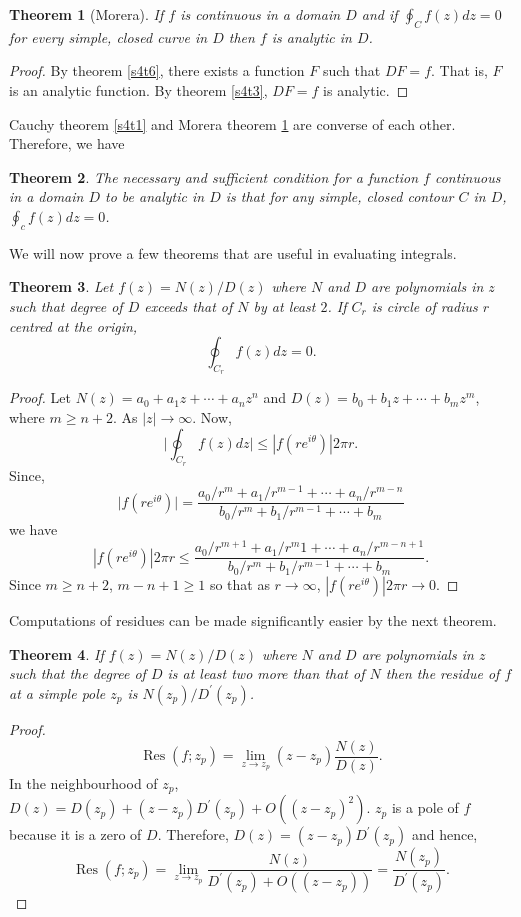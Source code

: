 \documentclass{article}
\theoremstyle{plain}
\newtheorem{thm}{Theorem}
\numberwithin{thm}{section}
\theoremstyle{plain}
\numberwithin{prop}{section}
\theoremstyle{plain}
\numberwithin{prop}{section}
\theoremstyle{definition}
\numberwithin{defn}{section}
\theoremstyle{remark}
\numberwithin{equation}{section}
\newcommand{\op}{\prime}
\DeclareMathOperator{\res}{Res}
\begin{document}
\begin{thm}[Morera]\label{s4t7}
If $f$ is continuous in a domain $D$ and if $\oint_C f(z)dz = 0$ for every
simple, closed curve in $D$ then $f$ is analytic in $D$.
\end{thm}
\begin{proof}
By theorem \ref{s4t6}, there exists a function $F$ such that $DF = f$. That is,
$F$ is an analytic function. By theorem \ref{s4t3}, $DF = f$ is analytic.
\end{proof}

Cauchy theorem \ref{s4t1} and Morera theorem \ref{s4t7} are converse of each
other. Therefore, we have
\begin{thm}\label{s4t8}
The necessary and sufficient condition for a function $f$ continuous in a domain
$D$ to be analytic in $D$ is that for any simple, closed contour $C$ in $D$,
$\oint_c f(z)dz = 0$.
\end{thm}

We will now prove a few theorems that are useful in evaluating integrals.
\begin{thm}\label{c4t9}
Let $f(z) = N(z)/D(z)$ where $N$ and $D$ are polynomials in $z$ such that
degree of $D$ exceeds that of $N$ by at least $2$. If $C_r$ is circle of 
radius $r$ centred at the origin,
\[
\oint_{C_r} f(z)dz = 0.
\]
\end{thm}
\begin{proof}
Let $N(z) = a_0 + a_1z + \cdots + a_nz^n$ and $D(z) = b_0+b_1z+\cdots+b_mz^m$,
where $m \ge n + 2$. As $|z| \rightarrow \infty$. Now,
\[
\Big|\oint_{C_r} f(z)dz\Big| \le |f(re^{i\theta})|2\pi r.
\]
Since,
\[
\Big|f(re^{i\theta})\Big| = \frac{a_0/r^m + a_1/r^{m-1} + \cdots + a_n/r^{m-n}}
{b_0/r^m + b_1/r^{m-1} + \cdots + b_m}
\]
we have
\[
|f(re^{i\theta})|2\pi r \le \frac{a_0/r^{m+1}+a_1/r^m1+\cdots+a_n/r^{m-n+1}}
{b_0/r^m + b_1/r^{m-1} + \cdots + b_m}.
\]
Since $m \ge n + 2$, $m - n + 1 \ge 1$ so that as $r \rightarrow \infty$,
$|f(re^{i\theta})|2\pi r \rightarrow 0$.
\end{proof}

Computations of residues can be made significantly easier by the next theorem.
\begin{thm}\label{s4t10}
If $f(z) = N(z)/D(z)$ where $N$ and $D$ are polynomials in $z$ such that the
degree of $D$ is at least two more than that of $N$ then the residue of $f$ at
a simple pole $z_p$ is $N(z_p)/D^\op(z_p)$.
\end{thm}
\begin{proof}
\[
\res(f; z_p) = \lim_{z \rightarrow z_p}(z - z_p)\frac{N(z)}{D(z)}.
\]
In the neighbourhood of $z_p$, $D(z) = D(z_p) + (z - z_p)D^\op(z_p) + 
O((z - z_p)^2)$. $z_p$ is a pole of $f$ because it is a zero of $D$. Therefore,
$D(z) = (z - z_p)D^\op(z_p)$ and hence,
\[
\res(f; z_p) = \lim_{z \rightarrow z_p} \frac{N(z)}{D^\op(z_p) + O((z - z_p))}
= \frac{N(z_p)}{D^\op(z_p)}.
\]
\end{proof}
\end{document}
